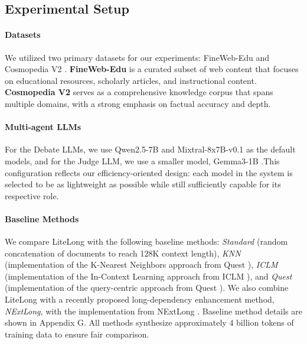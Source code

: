 \documentclass{article}
\theoremstyle{plain}
\theoremstyle{definition}
\theoremstyle{remark}
\begin{document}
\subsection{Experimental Setup}
    \paragraph{Datasets}
    We utilized two primary datasets for our experiments: FineWeb-Edu \cite{lozhkov2024finewebedu} and Cosmopedia V2 \cite{benallal2024smollmcorpus}. \textbf{FineWeb-Edu} is a curated subset of web content that focuses on educational resources, scholarly articles, and instructional content. \textbf{Cosmopedia V2} serves as a comprehensive knowledge corpus that spans multiple domains, with a strong emphasis on factual accuracy and depth.%

    \paragraph{Multi-agent LLMs}
    For the Debate LLMs, we use Qwen2.5-7B \cite{qwen2.5} and 
    Mixtral-8x7B-v0.1 \cite{jiang2024mixtral} as the default models, and for the Judge LLM, we use a smaller model, Gemma3-1B \cite{team2025gemma}.This configuration reflects our efficiency-oriented design: each model in the system is selected to be as lightweight as possible while still sufficiently capable for its respective role.

    \paragraph{Baseline Methods}
    We compare LiteLong with the following baseline methods: \textit{Standard} \cite{ouyang2022training} (random concatenation of documents to reach 128K context length), \textit{KNN} \cite{guu2020retrieval, levine2022the}(implementation of the K-Nearest Neighbors approach from Quest \cite{gao2025quest}), \textit{ICLM} \cite{shi2024incontext} (implementation of the In-Context Learning approach from ICLM \cite{shi2024incontext}), and \textit{Quest} (implementation of the query-centric approach from Quest \cite{gao2025quest}). We also combine LiteLong with a recently proposed long-dependency enhancement method, \textit{NExtLong}, with the implementation from NExtLong \cite{gao2025nextlong}. Baseline method details are shown in Appendix G. All methods synthesize approximately 4 billion tokens of training data to ensure fair comparison.
\end{document}
